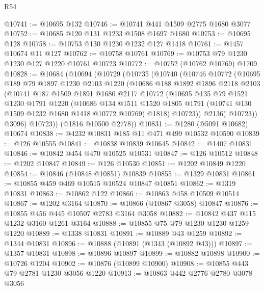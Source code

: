 \begin{lexlean}{R54}
\begin{coremodule}
@10741 := @10695 @132
@10746 := @10741 @441 @1509 @2775 @1680 @3077
@10752 := @10685 @120 @131 @1233 @1508 @1697 @1680
@10753 := @10695 @128
@10758 := @10753 @130 @1230 @1232 @127 @1418
@10761 := @1457 @10674 @11 @127
@10762 := @10758 @10761
@10769 := @10753 @79 @1230 @1230 @127 @1220 @10761 @10723
@10772 := @10752 (@10762 @10769) @1709
@10828 := @10684
    (@10694
      (@10729
        (@10735
          (@10740
            (@10746
              @10772
              (@10695
                @189
                @79
                @1897
                @1230
                @2103
                @1220
                (@10686
                  @188
                  @1892
                  @1896
                  @2118
                  @2103
                  (@10741
                    @187
                    @1509
                    @1891
                    @1680
                    @2117
                    @10772
                    (@10695
                      @135
                      @79
                      @1521
                      @1230
                      @1791
                      @1220
                      (@10686
                        @134
                        @1511
                        @1520
                        @1805
                        @1791
                        (@10741 @130 @1509 @1232 @1680 @1418 @10772 @10769)
                        @1818)
                      @10723))
                  @2136)
                @10723))
            @3096)
          @10723))
      (@1816 @10500 @2778))
@10831 := @1280 (@5091 @10682) @10674
@10838 := @4232 @10831 @185 @11 @471 @499 @10532 @10590
@10839 := @126 @10555
@10841 := @10838 @10839 @10645
@10842 := @1407 @10831
@10846 := @10842 @454 @470 @10525 @10531
@10847 := @126 @10512
@10848 := @1202 @10847
@10849 := @126 @10530
@10851 := @1202 @10849 @1220
@10854 := @10846 (@10848 @10851) @10839
@10855 := @1329 @10831
@10861 := @10855 @459 @469 @10515 @10524 @10847 @10851
@10862 := @1319 @10831
@10863 := @10862 @122
@10866 := @10863 @458 @10509 @10514
@10867 := @1202 @3164
@10870 := @10866 (@10867 @3058) @10847
@10876 := @10855 @456 @445 @10507 @2783 @3164 @3058
@10882 := @10842 @437 @115 @1232 @3160 @1261 @3164
@10888 := @10855 @75 @79 @1230 @1230 @1259 @1220
@10889 := @1338 @10831
@10891 := @10889 @43 @1259
@10892 := @1344 @10831
@10896 := @10888 (@10891 (@1343 (@10892 @43)))
@10897 := @1357 @10831
@10898 := @10896 @10897
@10899 := @10882 @10898
@10900 := @10726 @1204
@10902 := @10876 (@10899 @10900)
@10908 := @10855 @443 @79 @2781 @1230 @3056 @1220
@10913 := @10863 @442 @2776 @2780 @3078 @3056

\end{coremodule}
\end{lexlean}
